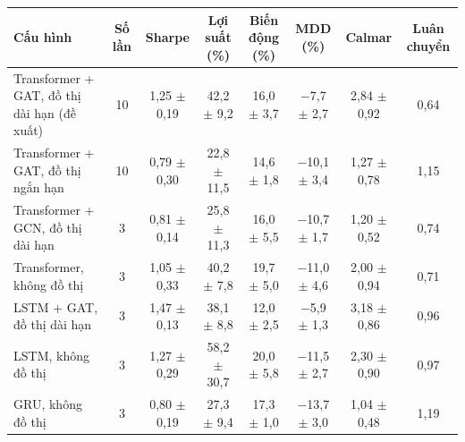 \begin{tabular}{@{}lccccccc@{}}
\toprule
Cấu hình & Số lần & Sharpe & Lợi suất (\%) & Biến động (\%) & MDD (\%) & Calmar & Luân chuyển \\
\midrule
Transformer + GAT, đồ thị dài hạn (đề xuất) & 10 & 1{,}25 $\pm$ 0{,}19 & 42{,}2 $\pm$ 9{,}2 & 16{,}0 $\pm$ 3{,}7 & $-$7{,}7 $\pm$ 2{,}7 & 2{,}84 $\pm$ 0{,}92 & 0{,}64 \\
Transformer + GAT, đồ thị ngắn hạn & 10 & 0{,}79 $\pm$ 0{,}30 & 22{,}8 $\pm$ 11{,}5 & 14{,}6 $\pm$ 1{,}8 & $-$10{,}1 $\pm$ 3{,}4 & 1{,}27 $\pm$ 0{,}78 & 1{,}15 \\
Transformer + GCN, đồ thị dài hạn & 3 & 0{,}81 $\pm$ 0{,}14 & 25{,}8 $\pm$ 11{,}3 & 16{,}0 $\pm$ 5{,}5 & $-$10{,}7 $\pm$ 1{,}7 & 1{,}20 $\pm$ 0{,}52 & 0{,}74 \\
Transformer, không đồ thị & 3 & 1{,}05 $\pm$ 0{,}33 & 40{,}2 $\pm$ 7{,}8 & 19{,}7 $\pm$ 5{,}0 & $-$11{,}0 $\pm$ 4{,}6 & 2{,}00 $\pm$ 0{,}94 & 0{,}71 \\
LSTM + GAT, đồ thị dài hạn & 3 & 1{,}47 $\pm$ 0{,}13 & 38{,}1 $\pm$ 8{,}8 & 12{,}0 $\pm$ 2{,}5 & $-$5{,}9 $\pm$ 1{,}3 & 3{,}18 $\pm$ 0{,}86 & 0{,}96 \\
LSTM, không đồ thị & 3 & 1{,}27 $\pm$ 0{,}29 & 58{,}2 $\pm$ 30{,}7 & 20{,}0 $\pm$ 5{,}8 & $-$11{,}5 $\pm$ 2{,}7 & 2{,}30 $\pm$ 0{,}90 & 0{,}97 \\
GRU, không đồ thị & 3 & 0{,}80 $\pm$ 0{,}19 & 27{,}3 $\pm$ 9{,}4 & 17{,}3 $\pm$ 1{,}0 & $-$13{,}7 $\pm$ 3{,}0 & 1{,}04 $\pm$ 0{,}48 & 1{,}19 \\
\bottomrule
\end{tabular}
